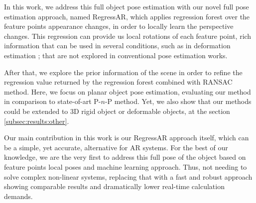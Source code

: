 \documentclass[annual]{acmsiggraph}
\begin{document}

In this work, we address this full object pose estimation with our novel full pose estimation approach, named RegressAR, which applies regression forest \cite{Criminisi:Book} over the feature points appearance changes, in order to locally learn the perspective changes. This regression can provide us local rotations of each feature point, rich information that can be used in several conditions, such as in deformation estimation \cite{Tokunaga:2015,Rendl:2014}; that are not explored in conventional pose estimation works. 

After that, we explore the prior information of the scene in order to refine the regression value returned by the regression forest combined with RANSAC method. Here, we focus on planar object pose estimation, evaluating our method in comparison to state-of-art P-$n$-P method. Yet, we also show that our methods could be extended to 3D rigid object or deformable objects, at the section \ref{subsec:results:other}.   

Our main contribution in this work is our RegressAR approach itself, which can be a simple, yet accurate, alternative for AR systems. For the best of our knowledge, we are the very first to address this full pose of the object based on feature points local poses and machine learning approach. Thus, not needing to solve complex non-linear systems, replacing that with a fast and robust approach showing comparable results and dramatically lower real-time calculation demands.
\end{document}

